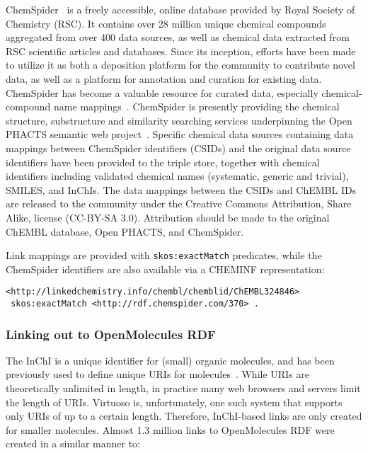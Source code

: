 \documentclass[10pt]{bmc_article}
\newenvironment{bmcformat}{\begin{raggedright}\baselineskip20pt\sloppy\setboolean{publ}{false}}{\end{raggedright}\baselineskip20pt\sloppy}
\begin{document}
\begin{bmcformat}
ChemSpider~\cite{Pence2010} is a freely accessible, online database provided by Royal Society of Chemistry (RSC).
It contains over 28 million unique
chemical compounds aggregated from over 400 data sources, as well as chemical data extracted
from RSC scientific articles and databases. Since its inception, efforts have been made to
utilize it as both a deposition platform for the community to contribute novel data, as
well as a platform for annotation and curation for existing data. ChemSpider has become a
valuable resource for curated data, especially chemical-compound name mappings~\cite{Williams2011}. ChemSpider
is presently providing the chemical structure, substructure and similarity searching services 
underpinning the Open PHACTS semantic web project~\cite{Williams2012}. Specific chemical data 
sources containing data mappings between ChemSpider identifiers (CSIDs) and the original data 
source identifiers have been provided to the triple store, together with chemical identifiers 
including validated chemical names (systematic, generic and trivial), SMILES, and InChIs. 
The data mappings between the CSIDs and ChEMBL IDs are released to the 
community under the Creative Commons Attribution, Share Alike, license (CC-BY-SA 3.0). Attribution 
should be made to the original ChEMBL database, Open PHACTS, and ChemSpider.

Link mappings are provided with \verb+skos:exactMatch+ predicates, while the ChemSpider identifiers
are also available via a CHEMINF representation:
 
\begin{small}
\begin{verbatim}
<http://linkedchemistry.info/chembl/chemblid/ChEMBL324846>
 skos:exactMatch <http://rdf.chemspider.com/370> .
\end{verbatim}
\end{small}

\subsubsection*{Linking out to OpenMolecules RDF}

The InChI is a unique identifier for (small) organic molecules, and has been previously used
to define unique URIs for molecules~\cite{Bradley2009,Willighagen2011}. While URIs are theoretically unlimited in length,
in practice many web browsers and servers limit the length of URIs. Virtuoso is, unfortunately,
one such system that supports only URIs of up to a certain length. Therefore, InChI-based links are only created for smaller molecules. 
Almost 1.3 million links to OpenMolecules RDF were created in a similar manner to:


\end{bmcformat}
\end{document}
